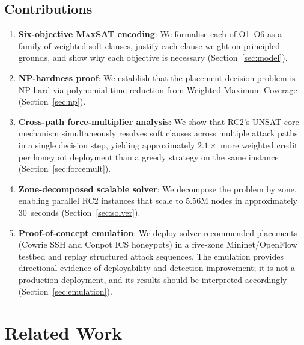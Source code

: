 \documentclass[journal]{IEEEtran}
\newcommand{\MAXSAT}{\textsc{MaxSAT}}
\begin{document}
\subsection{Contributions}
\label{sec:intro:contrib}

\begin{enumerate}
  \item \textbf{Six-objective \MAXSAT{} encoding}: We formalise each
    of O1--O6 as a family of weighted soft clauses, justify each
    clause weight on principled grounds, and show why each objective
    is necessary (Section~\ref{sec:model}).

  \item \textbf{NP-hardness proof}: We establish that the placement
    decision problem is NP-hard via polynomial-time reduction from
    Weighted Maximum Coverage~\cite{feige1998}
    (Section~\ref{sec:np}).

  \item \textbf{Cross-path force-multiplier analysis}: We show that
    RC2's UNSAT-core mechanism simultaneously resolves soft clauses
    across multiple attack paths in a single decision step, yielding
    approximately $2.1\times$ more weighted credit per honeypot
    deployment than a greedy strategy on the same instance
    (Section~\ref{sec:forcemult}).

  \item \textbf{Zone-decomposed scalable solver}: We decompose the
    problem by zone, enabling parallel RC2 instances that scale to
    5.56M nodes in approximately 30~seconds
    (Section~\ref{sec:solver}).

  \item \textbf{Proof-of-concept emulation}: We deploy
    solver-recommended placements (Cowrie SSH and Conpot ICS
    honeypots) in a five-zone Mininet/OpenFlow testbed and replay
    structured attack sequences. The emulation provides directional
    evidence of deployability and detection improvement; it is not
    a production deployment, and its results should be interpreted
    accordingly (Section~\ref{sec:emulation}).
\end{enumerate}

\section{Related Work}
\label{sec:related}
\end{document}

